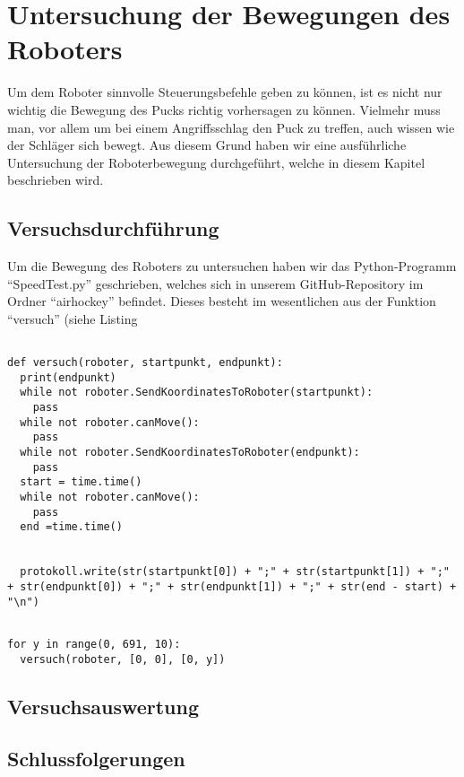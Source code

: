 
\chapter{Untersuchung der Bewegungen des Roboters}
Um dem Roboter sinnvolle Steuerungsbefehle geben zu können, ist es nicht nur wichtig die Bewegung des Pucks richtig vorhersagen zu können. Vielmehr muss man, vor allem um bei einem Angriffsschlag den Puck zu treffen, auch wissen wie der Schläger sich bewegt. Aus diesem Grund haben wir eine ausführliche Untersuchung der Roboterbewegung durchgeführt, welche in diesem Kapitel beschrieben wird.

\section{Versuchsdurchführung}
Um die Bewegung des Roboters zu untersuchen haben wir das Python-Programm \enquote{SpeedTest.py} geschrieben, welches sich in unserem GitHub-Repository im Ordner \enquote{airhockey} befindet. Dieses besteht im wesentlichen aus der Funktion \enquote{versuch} (siehe Listing 

\begin{lstlisting}[caption= Funktion zur Zeitmessung, label=speed1]

def versuch(roboter, startpunkt, endpunkt):
  print(endpunkt)
  while not roboter.SendKoordinatesToRoboter(startpunkt):
    pass
  while not roboter.canMove():
    pass
  while not roboter.SendKoordinatesToRoboter(endpunkt):
    pass  
  start = time.time()
  while not roboter.canMove():
    pass
  end =time.time()
  

  protokoll.write(str(startpunkt[0]) + ";" + str(startpunkt[1]) + ";" + str(endpunkt[0]) + ";" + str(endpunkt[1]) + ";" + str(end - start) + "\n")


\end{lstlisting}  

\begin{lstlisting}[caption=Python-Programm: Abfahren der Grundlinie, label=speed2]
for y in range(0, 691, 10):
  versuch(roboter, [0, 0], [0, y])
\end{lstlisting} 

\section{Versuchsauswertung}

\section{Schlussfolgerungen}